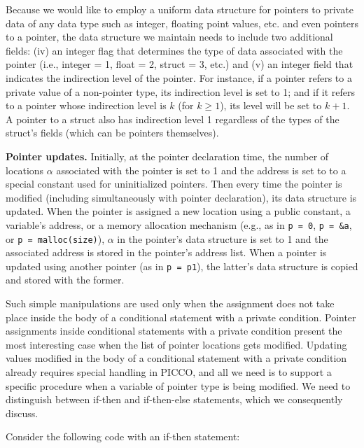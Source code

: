 \documentclass[11pt]{article}
\begin{document}
Because we would like to employ a uniform data structure for pointers to
private data of any data type such as integer, floating point values, etc.
and even pointers to a pointer, the data structure we maintain needs to
include two additional fields: (iv) an integer flag that determines the type
of data associated with the pointer (i.e., integer = 1, float = 2, struct =
3, etc.) and (v) an integer field that indicates the indirection level of
the pointer. For instance, if a pointer refers to a private value of a
non-pointer type, its indirection level is set to 1; and if it refers to a
pointer whose indirection level is $k$ (for $k \ge 1$), its level will be
set to $k+1$. A pointer to a struct also has indirection level 1 regardless
of the types of the struct's fields (which can be pointers themselves). 

\medskip \noindent \textbf{Pointer updates.}
Initially, at the pointer declaration time, the number of locations $\alpha$
associated with the pointer is set to 1 and the address is set to to a
special constant used for uninitialized pointers. Then every time the
pointer is modified (including simultaneously with pointer declaration), its
data structure is updated. When the pointer is assigned a new location using
a public constant, a variable's address, or a memory allocation mechanism
(e.g., as in \texttt{p = 0}, \texttt{p = \&a}, or \texttt{p =
malloc(size)}), $\alpha$ in the pointer's data structure is set to 1 and the
associated address is stored in the pointer's address list. When a pointer
is updated using another pointer (as in \texttt{p = p1}), the latter's
data structure is copied and stored with the former. 

Such simple manipulations are used only when the assignment does not take
place inside the body of a conditional statement with a private condition.
Pointer assignments inside conditional statements with a private condition
present the most interesting case when the list of pointer locations gets
modified. Updating values modified in the body of a conditional statement
with a private condition already requires special handling in PICCO, and all
we need is to support a specific procedure when a variable of pointer type
is being modified. We need to distinguish between if-then and if-then-else
statements, which we consequently discuss. 

Consider the following code with an if-then statement:
\end{document}
